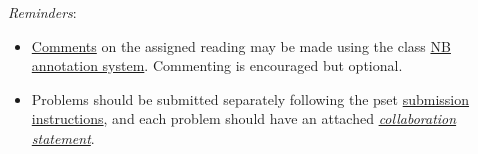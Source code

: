 \documentclass[handout]{mcs}
\begin{document}
\renewcommand{\reading}{
Part~\bref{part:proofs}{. \emph{Proofs:
      Introduction}}, Chapter~\bref{proofs_chap}{, \emph{What is a
      Proof?}}; Chapter~\bref{well_ordering_chap}{, \emph{The Well
      Ordering Principle}}.  These
  assigned readings \textbf{do not include the Problem sections}.  (Many
  of the problems in the text will appear as class or homework problems.)}


\emph{Reminders}:
\begin{itemize}
\item 
  \href{http://courses.csail.mit.edu/6.042/spring13/courseinfo#comments}{Comments}
  on the assigned reading may be made using the class
  \href{http://nb.csail.mit.edu}{NB annotation system}.  Commenting is
  encouraged but optional.

\item Problems should be submitted separately following the pset
  \href{http://courses.csail.mit.edu/6.042/spring13/submission.shtml}
       {submission instructions}, and each problem should have an attached
  \href{http://courses.csail.mit.edu/6.042/spring13/submission_template.pdf}
       {\emph{collaboration statement}}.

 \end{itemize}











\iffalse
\begin{center}
\large \textbf{Optional:}
\end{center}

\pinput{PS_faster_adder_logic}
\fi

\end{document}
